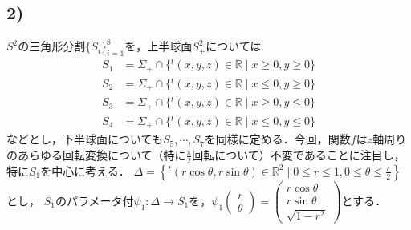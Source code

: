 \documentclass[dvipdfmx,nosetpagesize, uplatex]{jsarticle}
\theoremstyle{definition}
\theoremstyle{StatementsWithStar}
\theoremstyle{StatementsWithStar2}
\theoremstyle{StatementsWithStar3}
\theoremstyle{StatementsWithCCirc}
\theoremstyle{definition}
\begin{document}
\subsection*{2)}

$S^2$の三角形分割$\{S_i\}_{i=1}^8$を，上半球面$S^2_+$については
\begin{align*}
    S_1 &= \Sigma_+\cap\{{}^t(x,y,z)\in\mathbb{R}\mid x\ge 0,y\ge 0\}\\
    S_2 &= \Sigma_+\cap\{{}^t(x,y,z)\in\mathbb{R}\mid x\le 0,y\ge 0\}\\
    S_3 &= \Sigma_+\cap\{{}^t(x,y,z)\in\mathbb{R}\mid x\ge 0,y\le 0\}\\
    S_4 &= \Sigma_+\cap\{{}^t(x,y,z)\in\mathbb{R}\mid x\le 0,y\le 0\}
\end{align*}
などとし，下半球面についても$S_5,\cdots,S_7$を同様に定める．今回，関数$f$は$z$軸周りのあらゆる回転変換について（特に$\frac{\pi}{2}$回転について）不変であることに注目し，特に$S_1$を中心に考える．
$\Delta=\left\{ {}^t(r\cos\theta,r\sin\theta)\in\mathbb{R}^2\mid 0\le r\le 1, 0\le\theta\le\frac{\pi}{2} \right\}$とし，
$S_1$のパラメータ付$\psi_1:\Delta\to S_1$を，$\psi_1\left(\begin{array}{c}r \\\theta \end{array}\right)=\left(\begin{array}{c}r\cos\theta \\ r\sin\theta \\ \sqrt{1-r^2}\end{array}\right)$とする．
\end{document}
